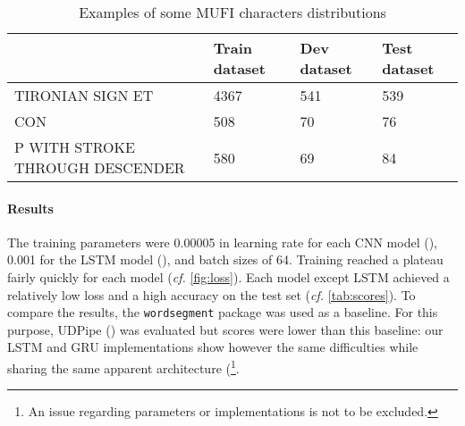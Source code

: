 \documentclass{jdmdh}
\begin{document}
\begin{table}[!ht]
\begin{tabular}{llll}
\hline
                                                   & Train dataset & Dev dataset & Test dataset \\ \hline
TIRONIAN SIGN ET                                   & 4367          & 541         & 539          \\
CON                             & 508           & 70          & 76           \\
P WITH STROKE THROUGH DESCENDER & 580           & 69          & 84           \\ \hline
\end{tabular}
  \caption{Examples of some MUFI characters distributions}
  \label{tab:mufi_examples}
\end{table}

\paragraph{Results}

The training parameters were 0.00005 in learning rate for each CNN model (\cite{lecun1998gradient}), 0.001 for the LSTM model (\cite{hochreiter1997long}), and batch sizes of 64. Training reached a plateau fairly quickly for each model (\textit{cf.} \ref{fig:loss}). Each model except LSTM achieved a relatively low loss and a high accuracy on the test set (\textit{cf.} \ref{tab:scores}). To compare the results, the \texttt{wordsegment} package \citet{WordSegment} was used as a baseline. For this purpose, UDPipe (\citet{udpipe:2017}) was evaluated but scores were lower than this baseline: our LSTM and GRU implementations show however the same difficulties while sharing the same apparent architecture (\footnote{An issue regarding parameters or implementations is not to be excluded.}.
\end{document}
